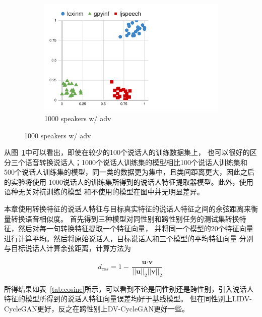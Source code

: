 \begin{figure}[!ht]
\begin{minipage}[b]{0.9\linewidth}
\begin{subfigure}[b]{0.3\linewidth}
            \includegraphics[width=\linewidth,trim=0 0 200 0,clip]{figure/5_dvector23.pdf}
            \caption{1000 speakers w/ adv}
        \end{subfigure}   
    \end{minipage}
    \label{fig:dvectordis}
\end{figure}

从图~\ref{fig:dvectordis}中可以看出，即使在较少的100个说话人的训练数据集上，
也可以很好的区分三个语音转换说话人；1000个说话人训练集的模型相比100个说话人训练集和
500个说话人训练集的模型，同一类的数据更为集中，且类间距离更大，因此之后的实验将使用
1000说话人的训练集所得到的说话人特征提取器模型。此外，使用语种无关对抗训练的模型
和不使用的模型在图中并无明显差异。

本章使用转换特征的说话人特征与目标真实特征的说话人特征之间的余弦距离来衡量转换语音相似度。
首先得到三种模型对同性别和跨性别任务的测试集转换特征，然后对每一句转换特征提取一个特征向量，
并将同一个模型的20个特征向量进行计算平均。然后将原始说话人，目标说话人和三个模型的平均特征向量
分别与目标说话人计算余弦距离，计算方法为

\begin{equation}
    d_{cos} = 1-\frac{\textbf{u} \cdot \textbf{v} }{\left| \left| \textbf{u}\right| \right|_2 \left| \left| \textbf{v}\right| \right|_2}
\end{equation}

所得结果如表~\ref{tab:cosine}所示，可以看到不论是同性别还是跨性别，引入说话人特征的模型所得到的说话人特征向量误差均好于基线模型。
但在同性别上LIDV-CycleGAN更好，反之在跨性别上DV-CycleGAN更好一些。




